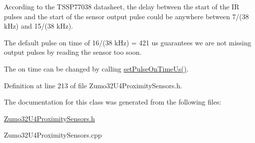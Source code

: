 According to the T\+S\+S\+P77038 datasheet, the delay between the start of the IR pulses and the start of the sensor output pulse could be anywhere between 7/(38 k\+Hz) and 15/(38 k\+Hz).

The default pulse on time of 16/(38 k\+Hz) = 421 us guarantees we are not missing output pulses by reading the sensor too soon.

The on time can be changed by calling \hyperlink{class_zumo32_u4_proximity_sensors_aeb626f226420976e774d93dd2a83e768}{set\+Pulse\+On\+Time\+Us()}. 

Definition at line 213 of file Zumo32\+U4\+Proximity\+Sensors.\+h.



The documentation for this class was generated from the following files\+:\begin{DoxyCompactItemize}
\item 
\hyperlink{_zumo32_u4_proximity_sensors_8h}{Zumo32\+U4\+Proximity\+Sensors.\+h}\item 
Zumo32\+U4\+Proximity\+Sensors.\+cpp\end{DoxyCompactItemize}
